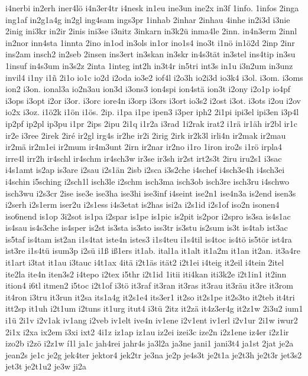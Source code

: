 {i4nerbi
in2erh
iner4lö
i4n3er4tr
i4nesk
in1eu
ine3un
ine2x
in3f
1info.
1infos
2inga
ing1af
in2g1a4g
in2gl
ing4sam
ings3pr
1inhab
2inhar
2inhau
4inhe
in2i3d
i3nie
2inig
ini3kr
in2ir
2inis
ini3se
i3nitz
3inkarn
in3k2ü
inma4le
2inn.
in4n3erm
2innl
in2nor
inn4sta
1innta
2ino
in1od
in3ols
in1or
ino1s4
ino3t
i1nö
in1ö2d
2inp
2inr
ins2am
insch2
in2seb
2insen
ins3ert
in3skan
in3skr
in4s3tät
in3stel
ins4tip
in3su
1insuf
in4s3um
in3s2z
2inta
1integ
int2h
in3t4r
in5tri
int3s
in1u
i3n2um
in3unz
invil4
i1ny
i1ñ
2i1o
io1c
io2d
i2oda
io3e2
iof4l
i2o3h
io2i3d
io3k4
i3ol.
i3om.
i3oms
ion2
i3on.
ional3a
io2n3au
ion3d
i3ons3
ion4spi
ion4stä
ion3t
i2ony
i2o1p
io4pf
i3ops
i3opt
i2or
i3or.
i3orc
iore4n
i3orp
i3ors
i3ort
io3s2
i2ost
i3ot.
i3ots
i2ou
i2ov
io2x
i3oz.
i1ö2k
i1ön
i1ös.
2ip.
i1pa
i1pe
ipen3
i3per
iph2
2i1pi
ipi3el
ipi3en
i3p4l
ip2pf
ip2pl
ip3pu
i1pr
2ips
2ipu
2i1q
i1r2a
i3rad
1i2rak
irat2
i1rä
ir1äh
ir2bl
ir1c
ir2e
i3ree
2irek
2iré
ir2gl
irg4s
ir2he
ir2i
2irig
2irk
ir2k3l
irli4n
ir2mak
ir2mau
ir2mä
ir2m1ei
ir2mum
ir4m3unt
2irn
ir2nar
ir2no
i1ro
1iron
iro2s
i1rö
irpla4
irre4l
irr2h
ir4schl
ir4schm
ir4sch3w
ir3se
ir3sh
ir2st
irt2s3t
2iru
iru2s1
i3sac
i4s1amt
is2ap
is3are
i2sau
i2s1än
2isb
i2sca
i3s2che
i4schef
i4sch3e4h
i4sch3ei
i4schin
i5sching
i2sch1l
isch3le
i2schm
isch3ma
isch3ob
isch3re
isch3ru
i4schwo
isch3wu
i2s3cr
2ise
ise3e
ise3ha
ise3hi
ise3inf
i4seint
ise2n1
ise4n3a
is2end
isen3s
i2serh
i2s1erm
iser2u
i2s1ess
i4s3etat
is2has
isi2a
i2s1id
i2s1of
iso2n
isonen4
iso6nend
is1op
3i2sot
is1pa
i2spar
is1pe
is1pic
is2pit
is2por
i2spro
is3sa
is4s1ac
is4sau
is4s3che
is4sper
is2st
is3sta
is3sto
iss3tr
is3stu
is2sum
is3t
is4tab
ist3ac
is5taf
is4tam
ist2an
i1s4tat
iste4n
istes3
i1s4teu
i1s4til
is4toc
is4tö
is5tör
ist4ra
ist3re
i1s4tü
isum3p
i2sü
i1ß
iß1ers
it1ab.
ital1a
it1alt
it1a2m
it1an
it2an.
it3a4re
it1art
i3tat
it1au
i3tauc
i4t1ax
4itä
i2t1äs
ität2
i2t1ei
i4teig
it2eil
i4tein
2itel
ite2la
ite4n
iten3s2
i4tepo
i2tex
i5thr
i2t1id
1itii
iti4kan
iti3k2e
i2t1in1
it2inn
ition4
i6tl
itmen2
i5toc
i2t1of
i3tö
it3raf
it3ran
it3ras
it3rau
it3räu
it3re
it3rom
it4ron
i3tru
it3run
it2sa
its1a4g
it2s1e4
its3er1
it2so
it2s1pe
it2s3to
it2teb
it4tri
itt2sp
it1uh
i2t1um
i2tuns
it1urg
itut4
i3tü
2itz
it2zä
it4z3er4g
it2z1w
2i3u2
ium1
i1ü
2i1v
i2v1ak
iv1ang
i2veb
iv1elt
ive4n
iv1ene
i2v1ent
iv1erl
i2v1ur
2i1w
iwur2
2i1x
i2xa
ix2em
i3xi
ixt2
4i1z
iz1ap
iz1au
iz2ei
izei3c
ize2n
i2z1ene
iz4er
i2z1ir
izo2b
i2zö
i2z1w
í1l
ja1c
jah4rei
jahr4s
ja3l2a
ja3ne
jani1
jani3t4
ja1st
2jat
je2a
jean2s
je1c
je2g
jek4ter
jektor4
jek2tr
je3na
je2p
je4s3t
je2t1a
je2t3h
je2t3r
jet3s2
jet3t
je2t1u2
je3w
ji2a
}
